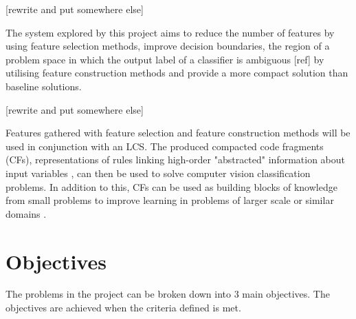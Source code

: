 [rewrite and put somewhere else]

The system explored by this project aims to reduce the number of features by using feature selection methods, improve decision boundaries, the region of a problem space in which the output label of a classifier is ambiguous [ref] by utilising feature construction methods and provide a more compact solution than baseline solutions. 

[rewrite and put somewhere else]

Features gathered with feature selection and feature construction methods will be used in conjunction with an LCS. The produced compacted code fragments (CFs), representations of rules linking high-order "abstracted" information about input variables \cite{urbanowicz2017introduction}, can then be used to solve computer vision classification problems. In addition to this, CFs can be used as building blocks of knowledge from small problems to improve learning in problems of larger scale or similar domains \cite{urbanowicz2017introduction}. 

\section{Objectives} \label{subsec:obj}
The problems in the project can be broken down into 3 main objectives. The objectives are achieved when the criteria defined is met.


